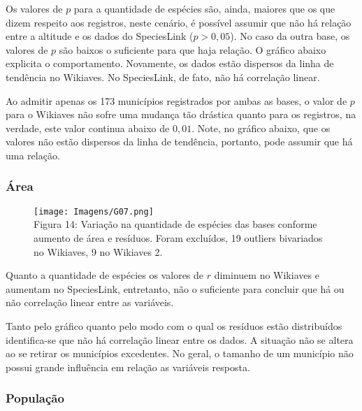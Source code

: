 \documentclass[12pt]{extarticle}
\newenvironment{resposta}{ \color{mygray}}{}
\begin{document}
\begin{resposta}
Os valores de $p$ para a quantidade de espécies são, ainda, maiores que os que dizem respeito aos registros, neste cenário, é possível assumir que não há relação entre a altitude e os dados do SpeciesLink ($p > 0,05$). No caso da outra base, os valores de $p$ são baixos o suficiente para que haja relação. O gráfico abaixo explicita o comportamento. Novamente, os dados estão dispersos da linha de tendência no Wikiaves. No SpeciesLink, de fato, não há correlação linear.

Ao admitir apenas os 173 municípios registrados por ambas as bases, o valor de $p$ para o Wikiaves não sofre uma mudança tão drástica quanto para os registros, na verdade, este valor continua abaixo de $0,01$. Note, no gráfico abaixo, que os valores não estão dispersos da linha de tendência, portanto, pode assumir que há uma relação.
\end{resposta}

\subsubsection{Área}



\begin{figure}[h!]
\centering
\texttt{[image: Imagens/G07.png]}
\\{\scriptsize Figura 14: Variação na quantidade de espécies das bases conforme aumento de área e resíduos. Foram excluídos, 19 outliers bivariados no Wikiaves, 9 no Wikiaves 2.}
\end{figure}

 \begin{resposta}
Quanto a quantidade de espécies os valores de $r$ diminuem no Wikiaves e aumentam no SpeciesLink, entretanto, não o suficiente para concluir que há ou não correlação linear entre as variáveis.

Tanto pelo gráfico quanto pelo modo com o qual os resíduos estão distribuídos identifica-se que não há correlação linear entre os dados. A situação não se altera ao se retirar os municípios excedentes. No geral, o tamanho de um município não possui grande influência em relação as variáveis resposta.
\end{resposta}

\subsubsection{População}
\end{document}
